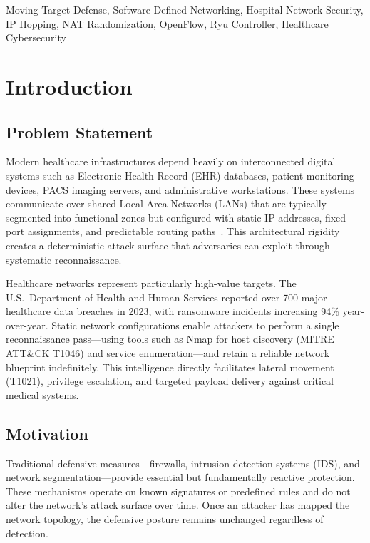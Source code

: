 \documentclass[conference]{IEEEtran}
\begin{document}
\begin{IEEEkeywords}
Moving Target Defense, Software-Defined Networking, Hospital Network Security, IP Hopping, NAT Randomization, OpenFlow, Ryu Controller, Healthcare Cybersecurity
\end{IEEEkeywords}

\section{Introduction}

\subsection{Problem Statement}

Modern healthcare infrastructures depend heavily on interconnected digital systems such as Electronic Health Record (EHR) databases, patient monitoring devices, PACS imaging servers, and administrative workstations. These systems communicate over shared Local Area Networks (LANs) that are typically segmented into functional zones but configured with static IP addresses, fixed port assignments, and predictable routing paths~\cite{dishington2019}. This architectural rigidity creates a deterministic attack surface that adversaries can exploit through systematic reconnaissance.

Healthcare networks represent particularly high-value targets. The U.S.\ Department of Health and Human Services reported over 700 major healthcare data breaches in 2023, with ransomware incidents increasing 94\% year-over-year. Static network configurations enable attackers to perform a single reconnaissance pass---using tools such as Nmap for host discovery (MITRE ATT\&CK T1046) and service enumeration---and retain a reliable network blueprint indefinitely. This intelligence directly facilitates lateral movement (T1021), privilege escalation, and targeted payload delivery against critical medical systems.

\subsection{Motivation}

Traditional defensive measures---firewalls, intrusion detection systems (IDS), and network segmentation---provide essential but fundamentally reactive protection. These mechanisms operate on known signatures or predefined rules and do not alter the network's attack surface over time. Once an attacker has mapped the network topology, the defensive posture remains unchanged regardless of detection.
\end{document}
